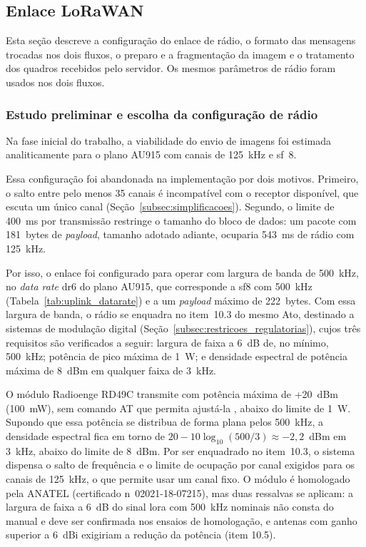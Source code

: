 \subsection{Enlace LoRaWAN}
\label{subsec:enlace}

Esta seção descreve a configuração do enlace de rádio, o formato das mensagens trocadas
nos dois fluxos, o preparo e a fragmentação da imagem e o tratamento dos quadros
recebidos pelo servidor. Os mesmos parâmetros de rádio foram usados nos dois fluxos.

\subsubsection{Estudo preliminar e escolha da configuração de rádio}
\label{subsubsec:estudo_preliminar_enlace}

Na fase inicial do trabalho, a viabilidade do envio de imagens foi estimada
analiticamente para o plano AU915 com canais de 125~kHz e \gls{sf}~8. 

Essa configuração foi abandonada na implementação por dois motivos. Primeiro, o salto
entre pelo menos 35 canais é incompatível com o receptor disponível, que escuta um único
canal (Seção~\ref{subsec:simplificacoes}). Segundo, o limite de 400~ms por transmissão
restringe o tamanho do bloco de dados: um pacote com 181~bytes de \textit{payload},
tamanho adotado adiante, ocuparia 543~ms de rádio com 125~kHz.

Por isso, o enlace foi configurado para operar com largura de banda de 500~kHz, no
\textit{data rate} \gls{dr}6 do plano AU915, que corresponde a \gls{sf}8 com 500~kHz
(Tabela~\ref{tab:uplink_datarate}) e a um \textit{payload} máximo de 222~bytes. 
Com essa largura de banda, o rádio se enquadra no item~10.3 do mesmo
Ato, destinado a sistemas de modulação digital (Seção~\ref{subsec:restricoes_regulatorias}),
cujos três requisitos são verificados a seguir: largura de faixa a 6~dB de, no mínimo,
500~kHz; potência de pico máxima de 1~W; e densidade espectral de potência máxima de 8~dBm
em qualquer faixa de 3~kHz.

O módulo Radioenge RD49C transmite com potência máxima de +20~dBm (100~mW), sem comando AT
que permita ajustá-la \cite{radioenge2022}, abaixo do limite de 1~W. Supondo que essa potência se distribua de forma plana pelos 500~kHz, a densidade
espectral fica em torno de
$20 - 10\log_{10}(500/3) \approx -2{,}2$~dBm em 3~kHz, abaixo do limite de 8~dBm. Por ser
enquadrado no item~10.3, o sistema dispensa o salto de frequência e o limite de ocupação
por canal exigidos para os canais de 125~kHz, o que permite usar um canal fixo. O módulo é
homologado pela ANATEL (certificado n\textordmasculine~02021-18-07215), mas duas ressalvas
se aplicam: a largura de faixa a 6~dB do sinal \gls{lora} com 500~kHz nominais não consta
do manual e deve ser confirmada nos ensaios de homologação, e antenas com ganho superior a
6~dBi exigiriam a redução da potência (item 10.5).


